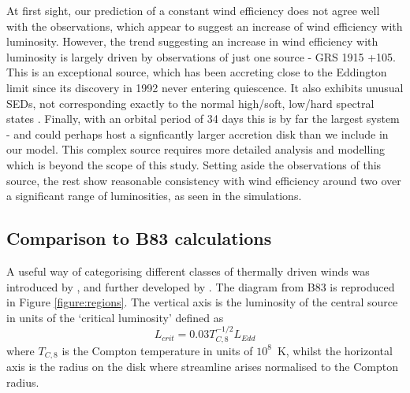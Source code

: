 \documentclass[a4paper,fleqn,usenatbib]{mnras}
\begin{document}
At first sight, our prediction of a constant wind efficiency does not
agree well with the observations, which appear to suggest an increase of wind efficiency with
luminosity. However, the trend suggesting an increase in wind efficiency with luminosity is largely driven 
by observations of just one source - GRS 1915 +105.  This is an exceptional source, which has been 
accreting close to the Eddington limit since its discovery in 1992 \citep{1994ApJS...92..469C,
2017MNRAS.468.4748C} never
entering quiescence. It also exhibits unusual SEDs, not corresponding exactly to the normal high/soft,
low/hard spectral states \citep{2016ApJ...833..165Z}. Finally, with an orbital period of 34 days 
\citep{2014SSRv..183..223C} this is by far the largest system - and could perhaps host a signficantly
larger accretion disk than we include in our model. This complex source requires more detailed
analysis and modelling which is beyond the scope of this study. Setting aside the observations of this
source, the rest show reasonable consistency with wind efficiency around two over a significant 
range of luminosities, as seen in the simulations.

\subsection{Comparison to B83 calculations}
\label{Section:B83}
A useful way of categorising different classes of thermally driven winds was introduced 
by \cite[hereafter B83]{1983ApJ...271...70B}, and further developed by \cite[hereafter W96]{1996ApJ...461..767W}. The
diagram from B83 is reproduced in Figure  \ref{figure:regions}. The vertical axis is the luminosity of the central
source in units of the `critical luminosity' defined as
\begin{equation}
L_{crit}=0.03T_{C,8}^{-1/2}L_{Edd}
\label{L_crit}
\end{equation}
where $T_{C,8}$ is the Compton temperature in units of $10^8$~K,
whilst the horizontal axis is the radius on the disk where streamline arises normalised to the Compton radius. 
\end{document}
